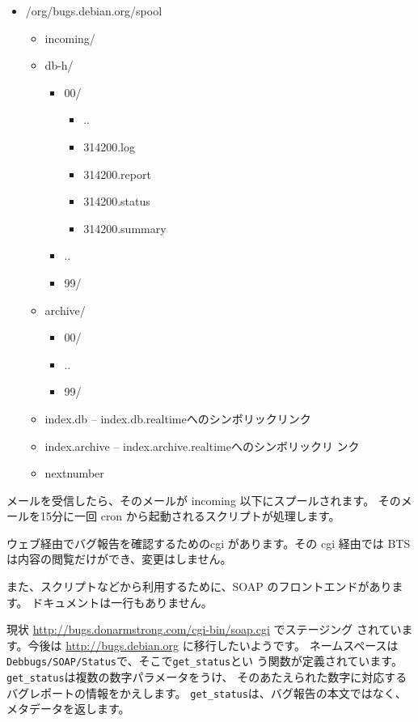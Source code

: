 \documentclass[mingoth,a4paper]{jsarticle}
\begin{document}
\begin{itemize}
 \item /org/bugs.debian.org/spool
       \begin{itemize}
	\item incoming/
	\item db-h/
	      \begin{itemize}
	       \item 00/
		     \begin{itemize}
		      \item ..
		      \item 314200.log
		      \item 314200.report
		      \item 314200.status
		      \item 314200.summary
		     \end{itemize}
	       \item ..
	       \item 99/
	      \end{itemize}
	\item archive/
	      \begin{itemize}
	       \item 00/
	       \item ..
	       \item 99/
	      \end{itemize}
	\item index.db -- index.db.realtimeへのシンボリックリンク
	\item index.archive -- index.archive.realtimeへのシンボリックリ
	      ンク
	\item nextnumber
       \end{itemize}
\end{itemize}

メールを受信したら、そのメールが incoming 以下にスプールされます。
そのメールを15分に一回 cron から起動されるスクリプトが処理します。


ウェブ経由でバグ報告を確認するためのcgi があります。その cgi 経由では 
BTS は内容の閲覧だけができ、変更はしません。

また、スクリプトなどから利用するために、SOAP のフロントエンドがあります。
ドキュメントは一行もありません。

現状 \url{http://bugs.donarmstrong.com/cgi-bin/soap.cgi} でステージング
されています。今後は \url{http://bugs.debian.org} に移行したいようです。
ネームスペースは\texttt{Debbugs/SOAP/Status}で、そこで\verb!get_status!とい
う関数が定義されています。\verb!get_status!は複数の数字パラメータをうけ、
そのあたえられた数字に対応するバグレポートの情報をかえします。
\verb!get_status!は、バグ報告の本文ではなく、メタデータを返します。
\end{document}
